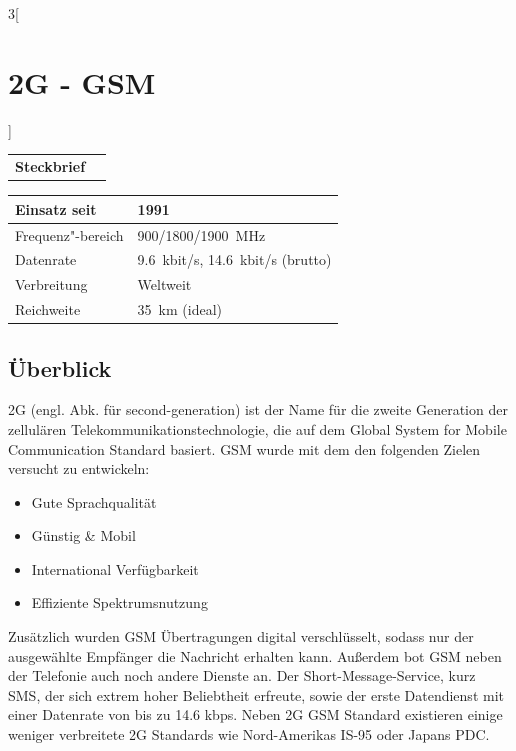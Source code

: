 \begin{multicols}{3}[\section{2G - GSM}]

\newrefsegment

\begin{boxedminipage}{\linewidth}
\begin{tabular}{p{}p{2.7 cm}}
\textbf{Steckbrief}& \\
\end{tabular}
\begin{tabular}{p{}|p{2.7 cm}}
      Einsatz seit & 1991\\
      \hline
      Frequenz"-bereich  & 900/1800/\SI{1900}{\mega\hertz}\\
      \hline
      Datenrate & \SI{9,6}{kbit/s}, \SI{14,6}{kbit/s} (brutto) \\
      \hline
      Verbreitung & Weltweit\\
      \hline
      Reichweite & \SI{35}{\kilo\metre} (ideal)\\
\end{tabular}
\end{boxedminipage}
\par
\subsection*{Überblick}
2G (engl. Abk. für second-generation) ist der Name für die zweite Generation der zellulären Telekommunikationstechnologie, die auf dem Global System for Mobile Communication Standard basiert. 
GSM wurde mit dem den folgenden Zielen versucht zu entwickeln: 
\begin{itemize}
	\item Gute Sprachqualität
	\item Günstig \& Mobil
	\item International Verfügbarkeit
	\item Effiziente Spektrumsnutzung
\end{itemize}
Zusätzlich wurden GSM Übertragungen digital verschlüsselt, sodass nur der ausgewählte Empfänger die Nachricht erhalten kann. Außerdem bot GSM neben der Telefonie auch noch andere Dienste an. Der Short-Message-Service, kurz SMS, der sich extrem hoher Beliebtheit erfreute, sowie der erste Datendienst mit einer Datenrate von bis zu 14.6 kbps.
Neben 2G GSM Standard existieren einige weniger verbreitete 2G Standards wie Nord-Amerikas IS-95 oder Japans PDC.
\cite{G2.1}

\end{multicols}
